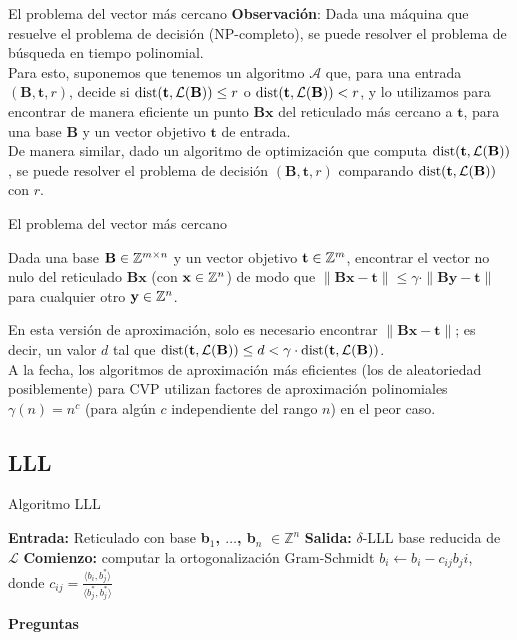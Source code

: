 \begin{frame}{El problema del vector más cercano}
\textbf{Observación}: Dada una máquina que resuelve el problema de decisión (NP-completo), se puede resolver el problema de búsqueda en tiempo polinomial.\\
\vspace{1em}
Para esto, suponemos que tenemos un algoritmo $\mathcal{A}$ que, para una entrada $(\mathbf{B},\mathbf{t},r)$, decide si $\text{dist}(\mathbf{t}, \mathcal{L}(\mathbf{B})) \leq r$ o $\text{dist}(\mathbf{t}, \mathcal{L}(\mathbf{B})) < r$, y lo utilizamos para encontrar de manera eficiente un punto $\mathbf{Bx}$ del reticulado más cercano a $\mathbf{t}$, para una base $\mathbf{B}$ y un vector objetivo $\mathbf{t}$ de entrada.\\
\vspace{1em}
De manera similar, dado un algoritmo de optimización que computa $\text{dist}(\mathbf{t},\mathcal{L}(\mathbf{B}))$, se puede resolver el problema de decisión $(\mathbf{B}, \mathbf{t}, r)$ comparando $\text{dist}(\mathbf{t},\mathcal{L}(\mathbf{B}))$ con $r$.
\end{frame}

\begin{frame}{El problema del vector más cercano}
\begin{definition}
Dada una base $\mathbf{B}\in \mathbb{Z}^{m\times n}$ y un vector objetivo $\mathbf{t} \in \mathbb{Z}^m$, encontrar el vector no nulo del reticulado $\mathbf{Bx}$ (con $\mathbf{x}\in \mathbb{Z}^n$) de modo que $\|\mathbf{Bx}-\mathbf{t}\| \leq \gamma \cdot \|\mathbf{By}-\mathbf{t}\|$ para cualquier otro $\mathbf{y} \in \mathbb{Z}^n$.
\end{definition}
\vspace{1em}
En esta versión de aproximación, solo es necesario encontrar $\|\mathbf{Bx}-\mathbf{t}\|$; es decir, un valor $d$ tal que $\text{dist}(\mathbf{t},\mathcal{L}(\mathbf{B})) \leq d < \gamma \cdot \text{dist}(\mathbf{t},\mathcal{L}(\mathbf{B}))$.\\
\vspace{1em}
A la fecha, los algoritmos de aproximación más eficientes (los de aleatoriedad posiblemente) para CVP utilizan factores de aproximación polinomiales $\gamma(n) = n^c$ (para algún $c$ independiente del rango $n$) en el peor caso.

\end{frame}

\subsection{LLL}
\begin{frame}{Algoritmo LLL}
    \begin{algorithmic}
    \State \textbf{Entrada:} Reticulado con base \textbf{b$_1$, $\dots$, b$_n$} $\in \mathbb{Z}^n$
    \State \textbf{Salida:} $\delta$-LLL base reducida de $\mathcal{L}$
    \State \textbf{Comienzo:} computar la ortogonalización Gram-Schmidt
            \State $b_i \gets b_i - c_{ij}b_ji$, donde $c_{ij} = \frac{\langle b_i, b^*_j \rangle}{\langle b^*_j,b^*_j \rangle}$ 
        \EndFor
    \EndFor 
    \end{algorithmic}
\end{frame}


\begin{frame}
    \begin{center}
        {\huge \bf Preguntas}
    \end{center}
\end{frame}



